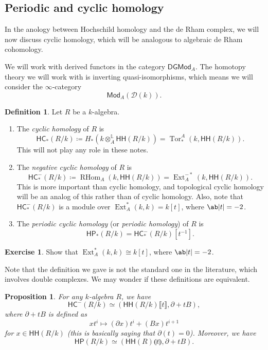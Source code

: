 \documentclass[10pt]{amsart}
\newtheorem{prop}[thm]{Proposition}
\theoremstyle{definition}
\newtheorem{defn}[thm]{Definition}
\newtheorem{exer}[thm]{Exercise}
\theoremstyle{remark}
\theoremstyle{plain}
\theoremstyle{definition}
\theoremstyle{remark}
\renewcommand{\L}{\mathbb{L}}
\newcommand{\mc}[1]{\mathcal{#1}}
\newcommand{\ms}[1]{\mathsf{#1}}
\newcommand{\1}{\mathbf{1}}
\newcommand{\2}{\mathbf{2}}
\newcommand{\3}{\mathbf{3}}
\newcommand{\ps}[1]{\llbracket #1 \rrbracket}
\newcommand{\ls}[1]{\llparenthesis #1 \rrparenthesis}
\newcommand{\HC}{\ms{HC}}
\newcommand{\HH}{\ms{HH}}
\newcommand{\HP}{\ms{HP}}
\DeclareMathOperator{\Tor}{Tor}
\DeclareMathOperator{\RHom}{RHom}
\DeclareMathOperator{\Ext}{Ext}
\begin{document}
\subsection{Periodic and cyclic homology}%
\label{sub:Periodic and cyclic homology}

In the anology between Hochschild homology and the de Rham complex, we will now discuss cyclic homology, which will be analogous to algebraic de Rham cohomology.

We will work with derived functors in the category $\ms{DGMod}_A$. The homotopy theory we will work with is inverting quasi-isomorphisms, which means we will consider the $\infty$-category
\[ \ms{Mod}_A(\mc{D}(k)). \]

\begin{defn}
    Let $R$ be a $k$-algebra.
    \begin{enumerate}
        \item The \textit{cyclic homology} of $R$ is
        \[ \HC_*(R/k) \coloneqq H_*(k \otimes_A^{\L} \HH(R/k)) = \Tor_*^A(k, \HH(R/k)). \]
        This will not play any role in these notes.
        \item The \textit{negative cyclic homology} of $R$ is
        \[ \HC_*^-(R/k) \coloneqq \RHom_A(k, \HH(R/k)) = \Ext_A^{-*}(k, \HH(R/k)). \]
        This is more important than cyclic homology, and topological cyclic homology will be an analog of this rather than of cyclic homology. Also, note that $\HC_*^-(R/k)$ is a module over $\Ext_A^{*}(k,k) = k[t]$, where $\ab|t| = -2$.
        \item The \textit{periodic cyclic homology} (or \textit{periodic homology}) of $R$ is
        \[ \HP_*(R/k) = \HC_*^-(R/k) [t^{-1}]. \]
    \end{enumerate}
\end{defn}

\begin{exer}
    Show that $\Ext_A^*(k,k) \cong k[t]$, where $\ab|t| = -2$.
\end{exer}

Note that the definition we gave is not the standard one in the literature, which involves double complexes. We may wonder if these definitions are equivalent.

\begin{prop}
    For any $k$-algebra $R$, we have
    \[ \HC^-(R/k) \simeq (\HH(R/k)\ps{t}, \partial + tB), \]
    where $\partial + tB$ is defined as
    \[ xt^i \mapsto (\partial x) t^i + (Bx) t^{i+1} \]
    for $x \in \HH(R/k)$ (this is basically saying that $\partial(t) = 0$). Moreover, we have
    \[ \HP(R/k) \simeq (\HH(R)\ls{t}, \partial + tB). \]
\end{prop}
\end{document}
